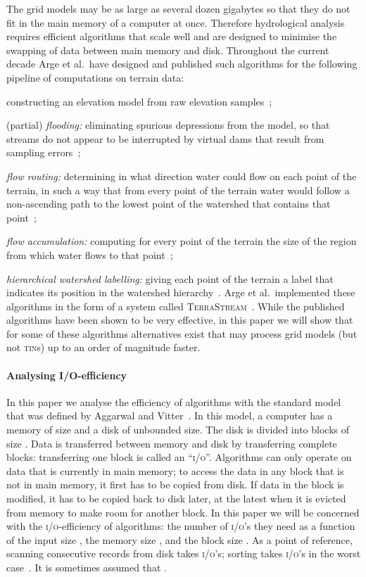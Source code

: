 \documentclass[10pt,a4paper]{article}
\newenvironment{denseitems}{\list{}{\itemsep0pt\parsep0pt}}{\endlist}
\def\tins{\textsc{tin}s\xspace}
\def\io{\textsc{i/o}\xspace}
\def\ios{\textsc{i/o}'s\xspace}
\def\tsm{\textsc{TerraStream}\xspace}
\begin{document}
The grid models may be as large as several dozen gigabytes so that they do not fit in the main memory of a computer at once. Therefore hydrological analysis requires efficient algorithms that scale well and are designed to minimise the swapping of data between main memory and disk. Throughout the current decade Arge et al.\ have designed and published such algorithms for the following pipeline of computations on terrain data:\begin{denseitems}
\item constructing an elevation model from raw elevation samples~\cite{cloud,terrastream};
\item (partial) \emph{flooding:} eliminating spurious depressions from the model, so that streams do not appear to be interrupted by virtual dams that result from sampling errors~\cite{unionfind,terraflow,terrastream};
\item \emph{flow routing:} determining in what direction water could flow on each point of the terrain, in such a way that from every point of the terrain water would follow a non-ascending path to the lowest point of the watershed that contains that point~\cite{terraflow,terrastream};
\item \emph{flow accumulation:} computing for every point of the terrain the size of the region from which water flows to that point~\cite{terraflow,gridproblems,terrastream};
\item \emph{hierarchical watershed labelling:} giving each point of the terrain a label that indicates its position in the watershed hierarchy~\cite{pfafstetter,terrastream}.
\end{denseitems}
Arge et al.\ implemented these algorithms in the form of a system called \tsm~\cite{terrastream}.
While the published algorithms have been shown to be very effective, in this paper we will show that for some of these algorithms alternatives exist that may process grid models (but not \tins) up to an order of magnitude faster.

\paragraph*{Analysing I/O-efficiency}
In this paper we analyse the efficiency of algorithms with the standard model that was defined by Aggarwal and Vitter~\cite{iomodel}. In this model, a computer has a memory of size  and a disk of unbounded size. The disk is divided into blocks of size . Data is transferred between memory and disk by transferring complete blocks: transferring one block is called an ``\io''. Algorithms can only operate on data that is currently in main memory; to access the data in any block that is not in main memory, it first has to be copied from disk. If data in the block is modified, it has to be copied back to disk later, at the latest when it is evicted from memory to make room for another block. In this paper we will be concerned with the \io-efficiency of algorithms: the number of \ios they need as a function of the input size , the memory size , and the block size . As a point of reference, scanning  consecutive records from disk takes  \ios; sorting takes  \ios in the worst case~\cite{iomodel}. It is sometimes assumed that .
\end{document}

